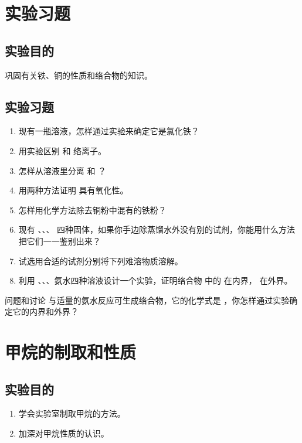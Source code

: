 \section{实验习题}
\subsection*{实验目的}
巩固有关铁、铜的性质和络合物的知识。
\subsection*{实验习题}
\begin{enumerate}[1.]
  \item 现有一瓶溶液，怎样通过实验来确定它是氯化铁？
  \item 用实验区别  和  络离子。
  \item 怎样从溶液里分离  和 ？
  \item 用两种方法证明  具有氧化性。
  \item 怎样用化学方法除去铜粉中混有的铁粉？
  \item 现有 、、、 四种固体，如果你手边除蒸馏水外没有别的试剂，你能用什么方法把它们一一鉴别出来？
  \item 试选用合适的试剂分别将下列难溶物质溶解。
  \begin{tasks}[item-indent=5em]
    \task {}
    \task {}
  \end{tasks}
  \item 利用 、、、氨水四种溶液设计一个实验，证明络合物  中的  在内界， 在外界。
\end{enumerate}
\begin{Theorem}{问题和讨论}
   与适量的氨水反应可生成络合物，它的化学式是 ，你怎样通过实验确定它的内界和外界？
\end{Theorem}

\section{甲烷的制取和性质}
\subsection*{实验目的}
\begin{enumerate}[1.]
  \item 学会实验室制取甲烷的方法。
  \item 加深对甲烷性质的认识。
\end{enumerate}
